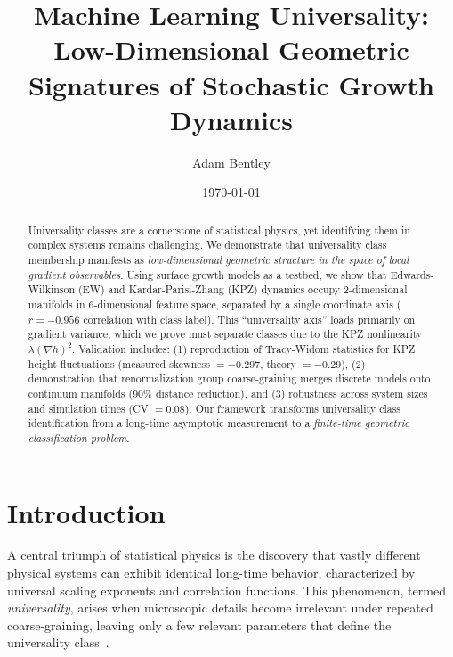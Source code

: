 \documentclass[aps,prl,twocolumn,superscriptaddress,showpacs]{revtex4-2}
\begin{document}
\title{Machine Learning Universality: Low-Dimensional Geometric Signatures of Stochastic Growth Dynamics}

\author{Adam Bentley}

\date{\today}

\begin{abstract}
Universality classes are a cornerstone of statistical physics, yet identifying them in complex systems remains challenging. We demonstrate that universality class membership manifests as \emph{low-dimensional geometric structure in the space of local gradient observables}. Using surface growth models as a testbed, we show that Edwards-Wilkinson (EW) and Kardar-Parisi-Zhang (KPZ) dynamics occupy 2-dimensional manifolds in 6-dimensional feature space, separated by a single coordinate axis ($r = -0.956$ correlation with class label). This ``universality axis'' loads primarily on gradient variance, which we prove must separate classes due to the KPZ nonlinearity $\lambda(\nabla h)^2$. Validation includes: (1) reproduction of Tracy-Widom statistics for KPZ height fluctuations (measured skewness $= -0.297$, theory $= -0.29$), (2) demonstration that renormalization group coarse-graining merges discrete models onto continuum manifolds (90\% distance reduction), and (3) robustness across system sizes and simulation times (CV $= 0.08$). Our framework transforms universality class identification from a long-time asymptotic measurement to a \emph{finite-time geometric classification problem}.
\end{abstract}


\maketitle

\section{Introduction}

A central triumph of statistical physics is the discovery that vastly different physical systems can exhibit identical long-time behavior, characterized by universal scaling exponents and correlation functions. This phenomenon, termed \emph{universality}, arises when microscopic details become irrelevant under repeated coarse-graining, leaving only a few relevant parameters that define the universality class~\cite{Kadanoff2000,Goldenfeld1992}.
\end{document}
